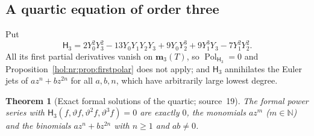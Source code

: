 \documentclass[11pt]{article}
\numberwithin{equation}{section}
\newtheorem{theorem}{Theorem}[section]
\theoremstyle{definition}
\theoremstyle{remark}
\newcommand{\N}{\mathbb N}
\begin{document}
\subsection{A quartic equation of order three}\label{hol:nr:sub:H3}

Put
\begin{equation}\label{hol:nr:eq:H3}
 \mathsf H_3=2Y_0^2Y_3^2-13Y_0Y_1Y_2Y_3+9Y_0Y_2^3+9Y_1^3Y_3-7Y_1^2Y_2^2 .
\end{equation}
All its first partial derivatives vanish on $\mathbf m_3(T)$, so
$\operatorname{Pol}_{\mathsf H_3}=0$ and Proposition~\ref{hol:nr:prop:firstpolar}
does not apply; and $\mathsf H_3$ annihilates the Euler jets of $az^n+bz^{2n}$
for all $a,b,n$, which have arbitrarily large lowest degree.

\begin{theorem}[Exact formal solutions of the quartic; source~19]
\label{hol:nr:thm:H3}
The formal power series with $\mathsf H_3(f,\vartheta f,\vartheta^2f,
\vartheta^3f)=0$ are exactly $0$, the monomials $az^m$ ($m\in\N$) and the
binomials $az^n+bz^{2n}$ with $n\ge1$ and $ab\ne0$.
\end{theorem}
\end{document}
